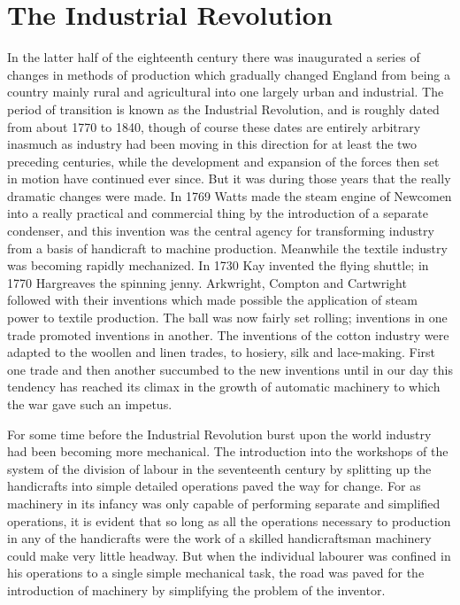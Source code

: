 \documentclass{book}
\begin{document}
\chapter{The Industrial Revolution}
\label{chapter-16}
In the latter half of the eighteenth century there was inaugurated a series of changes in methods of production which gradually changed England from being a country mainly rural and agricultural into one largely urban and industrial. The period of transition is known as the Industrial Revolution, and is roughly dated from about 1770 to 1840, though of course these dates are entirely arbitrary inasmuch as industry had been moving in this direction for at least the two preceding centuries, while the development and expansion of the forces then set in motion have continued ever since. But it was during those years that the really dramatic changes were made. In 1769 Watts made the steam engine of Newcomen into a really practical and commercial thing by the introduction of a separate condenser, and this invention was the central agency for transforming industry from a basis of handicraft to machine production. Meanwhile the textile industry was becoming rapidly mechanized. In 1730 Kay invented the flying shuttle; in 1770 Hargreaves the spinning jenny. Arkwright, Compton and Cartwright followed with their inventions which made possible the application of steam power to textile production. The ball was now fairly set rolling; inventions in one trade promoted inventions in another. The inventions of the cotton industry were adapted to the woollen and linen trades, to hosiery, silk and lace-making. First one trade and then another succumbed to the new inventions until in our day this tendency has reached its climax in the growth of automatic machinery to which the war gave such an impetus.

For some time before the Industrial Revolution burst upon the world industry had been becoming more mechanical. The introduction into the workshops of the system of the division of labour in the seventeenth century by splitting up the handicrafts into simple detailed operations paved the way for change. For as machinery in its infancy was only capable of performing separate and simplified operations, it is evident that so long as all the operations necessary to production in any of the handicrafts were the work of a skilled handicraftsman machinery could make very little headway. But when the individual labourer was confined in his operations to a single simple mechanical task, the road was paved for the introduction of machinery by simplifying the problem of the inventor.
\end{document}
